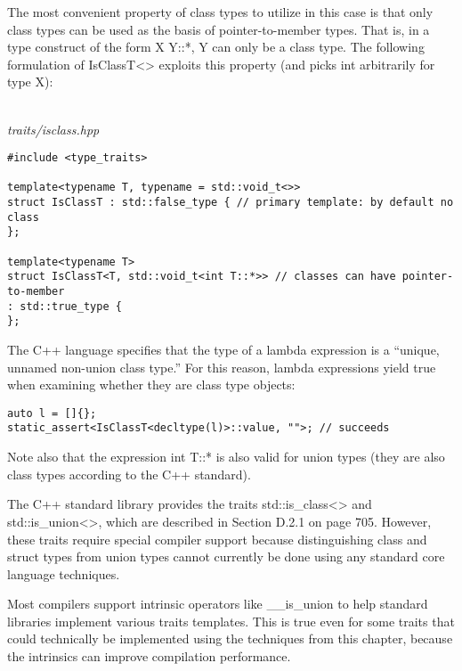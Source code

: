 The most convenient property of class types to utilize in this case is that only class types can be used as the basis of pointer-to-member types. That is, in a type construct of the form X Y::*, Y can only be a class type. The following formulation of IsClassT<> exploits this property (and picks int arbitrarily for type X):

\hspace*{\fill} \\ %
\noindent
\textit{traits/isclass.hpp}
\begin{lstlisting}[style=styleCXX]
#include <type_traits>

template<typename T, typename = std::void_t<>>
struct IsClassT : std::false_type { // primary template: by default no class
};

template<typename T>
struct IsClassT<T, std::void_t<int T::*>> // classes can have pointer-to-member
: std::true_type {
};
\end{lstlisting}

The C++ language specifies that the type of a lambda expression is a “unique, unnamed non-union class type.” For this reason, lambda expressions yield true when examining whether they are class type objects:

\begin{lstlisting}[style=styleCXX]
auto l = []{};
static_assert<IsClassT<decltype(l)>::value, "">; // succeeds
\end{lstlisting}

Note also that the expression int T::* is also valid for union types (they are also class types according to the C++ standard).

The C++ standard library provides the traits std::is\_class<> and std::is\_union<>, which are described in Section D.2.1 on page 705. However, these traits require special compiler support because distinguishing class and struct types from union types cannot currently be done using any standard core language techniques.

\begin{tcolorbox}[colback=webgreen!5!white,colframe=webgreen!75!black]
\hspace*{0.75cm} Most compilers support intrinsic operators like \_\_is\_union to help standard libraries implement various traits templates. This is true even for some traits that could technically be implemented using the techniques from this chapter, because the intrinsics can improve compilation performance.
\end{tcolorbox}


